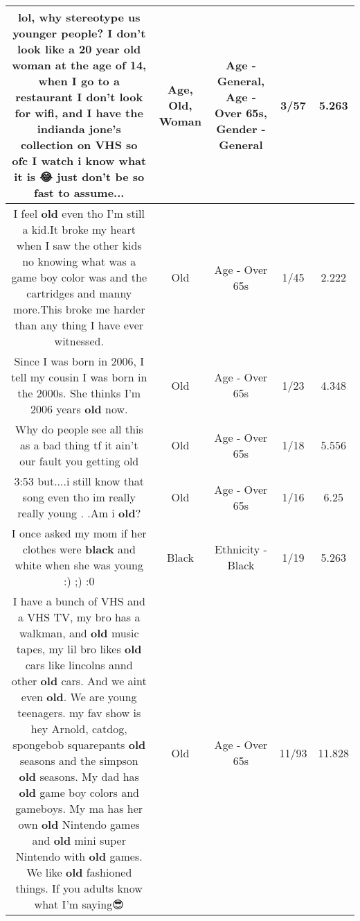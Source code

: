 \documentclass[11pt]{article}
\newlength\mylength
\begin{document}
\begin{center}
\begin{longtable}{|C{.65\mylength}|C{.30\mylength}|C{.12\mylength}|C{.12\mylength}|C{.12\mylength}|}
  \small lol, why stereotype us younger people? I don't look like a 20 year \textbf{old} \textbf{woman} at the \textbf{age} of 14, when I go to a restaurant I don't look for wifi, and I have the indianda jone's collection on VHS so ofc I watch i know what it is 😂 just don't be so fast to assume...\normalsize   & Age, Old, Woman & Age - General, Age - Over 65s, Gender - General & 3/57 & 5.263 \\  \hline
  \small I feel \textbf{old} even tho I'm still a kid.It broke my heart when I saw the other kids no knowing what was a game boy color was and the cartridges and manny more.This broke me harder than any thing I have ever witnessed.\normalsize   & Old & Age - Over 65s & 1/45 & 2.222 \\  \hline
  \small Since I was born in 2006, I tell my cousin I was born in the 2000s. She thinks I'm 2006 years \textbf{old} now.\normalsize   & Old & Age - Over 65s & 1/23 & 4.348 \\  \hline
  \small Why do people see all this as a bad thing tf it ain't our fault you getting old\normalsize   & Old & Age - Over 65s & 1/18 & 5.556 \\  \hline
  \small 3:53 but....i still know that song even tho im really really young . .Am i \textbf{old}?\normalsize   & Old & Age - Over 65s & 1/16 & 6.25 \\  \hline
  \small I once asked my mom if her clothes were \textbf{black} and white when she was young :) ;) :0\normalsize   & Black & Ethnicity - Black & 1/19 & 5.263 \\  \hline
  \small I have a bunch of VHS and a VHS TV,  my bro has a walkman, and \textbf{old} music tapes, my lil bro likes \textbf{old} cars like lincolns annd other \textbf{old} cars. And we aint even \textbf{old}. We are young teenagers. my fav show is hey Arnold, catdog, spongebob squarepants \textbf{old} seasons and the simpson \textbf{old} seasons. My dad has \textbf{old} game boy colors and gameboys. My ma has her own \textbf{old} Nintendo games and \textbf{old} mini super Nintendo with \textbf{old} games. We like \textbf{old} fashioned things. If you adults know what I'm saying😎\normalsize   & Old & Age - Over 65s & 11/93 & 11.828 \\  \hline

\end{longtable}
\end{center}
\end{document}
